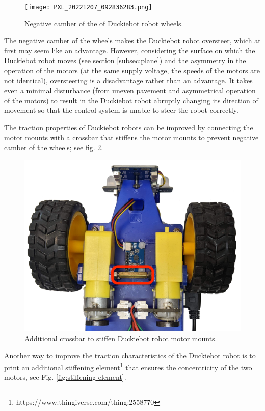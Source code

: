 \documentclass[conference]{IEEEtran}
\begin{document}
\begin{figure}
    \centering
    \texttt{[image: PXL\_20221207\_092836283.png]}
    \caption{Negative camber of the of Duckiebot robot wheels.}
    \label{fig:negative-camber}
\end{figure}

The negative camber of the wheels makes the Duckiebot robot oversteer, which at first may seem like an advantage. However, considering the surface on which the Duckiebot robot moves (see section \ref{subsec:plane}) and the asymmetry in the operation of the motors (at the same supply voltage, the speeds of the motors are not identical), oversteering is a disadvantage rather than an advantage. It takes even a minimal disturbance (from uneven pavement and asymmetrical operation of the motors) to result in the Duckiebot robot abruptly changing its direction of movement so that the control system is unable to steer the robot correctly.

The traction properties of Duckiebot robots can be improved by connecting the motor mounts with a crossbar that stiffens the motor mounts to prevent negative camber of the wheels; see fig. \ref{fig:stiffening-crossbar}.

\begin{figure}[ht!]
    \centering
    \includegraphics[width=1.0\columnwidth]{drive-upgrade.png}
    \caption{Additional crossbar to stiffen Duckiebot robot motor mounts.}
    \label{fig:stiffening-crossbar}
\end{figure}

Another way to improve the traction characteristics of the Duckiebot robot is to print an additional stiffening element\footnote{https://www.thingiverse.com/thing:2558770} that ensures the concentricity of the two motors, see Fig. \ref{fig:stiffening-element}.
\end{document}
